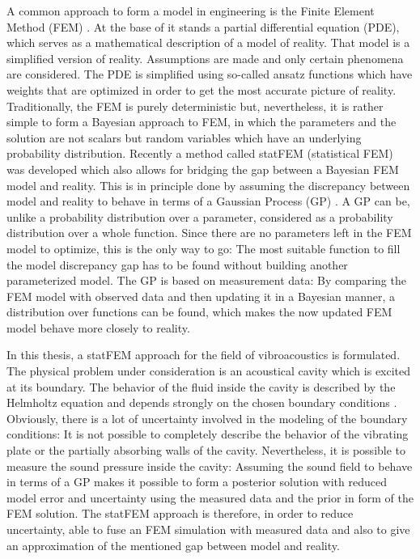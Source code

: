 \documentclass[%
  a4paper,oneside,%
  11pt,%
  smallchapters,
  style=printdev,
  extramargin,
  green,%
  rgb, <cmyk>
  ]{tubsbook}
\begin{document}
A common approach to form a model in engineering is the Finite Element Method (FEM) \cite{larson2013}. At the base of it stands a partial differential equation (PDE), which serves as a mathematical description of a model of reality. That model is a simplified version of reality. Assumptions are made and only certain phenomena are considered. The PDE is simplified using so-called ansatz functions which have weights that are optimized in order to get the most accurate picture of reality. Traditionally, the FEM is purely deterministic but, nevertheless, it is rather simple to form a Bayesian approach \cite[p. 151 ff.]{murphy2012} to FEM, in which the parameters and the solution are not scalars but random variables which have an underlying probability distribution. 
Recently a method called statFEM (statistical FEM) was developed \cite{girolami2021} which also allows for bridging the gap between a Bayesian FEM model and reality. This is in principle done by assuming the discrepancy between model and reality to behave in terms of a Gaussian Process (GP) \cite{rasmussen2006}. A GP can be, unlike a probability distribution over a parameter, considered as a probability distribution over a whole function. Since there are no parameters left in the FEM model to optimize, this is the only way to go: The most suitable function to fill the model discrepancy gap has to be found without building another parameterized model. The GP is based on measurement data: By comparing the FEM model with observed data and then updating it in a Bayesian manner, a distribution over functions can be found, which makes the now updated FEM model behave more closely to reality.

In this thesis, a statFEM approach for the field of vibroacoustics is formulated. The physical problem under consideration is an acoustical cavity which is excited at its boundary. The behavior of the fluid inside the cavity is described by the Helmholtz equation and depends strongly on the chosen boundary conditions \cite{atalla2015}. Obviously, there is a lot of uncertainty involved in the modeling of the boundary conditions: It is not possible to completely describe the behavior of the vibrating plate or the partially absorbing walls of the cavity. Nevertheless, it is possible to measure the sound pressure inside the cavity: Assuming the sound field to behave in terms of a GP makes it possible to form a posterior solution with reduced model error and uncertainty using the measured data and the prior in form of the FEM solution. The statFEM approach is therefore, in order to reduce uncertainty, able to fuse an FEM simulation with measured data and also to give an approximation of the mentioned gap between model and reality.
\end{document}

